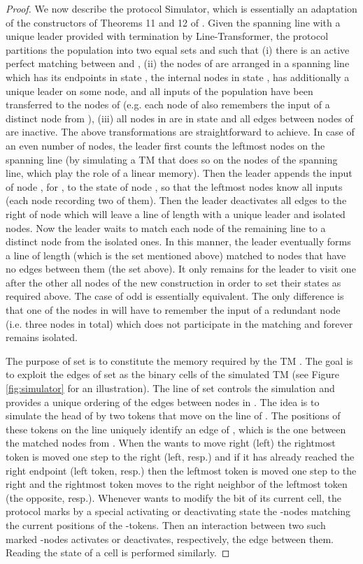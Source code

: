\documentclass[preprint]{elsarticle}
\begin{document}
\begin{proof}
We now describe the protocol Simulator, which is essentially an adaptation of the constructors of Theorems 11 and 12 of \cite{MS14}. Given the spanning line with a unique leader provided with termination by Line-Transformer, the protocol partitions the population into two equal sets  and  such that (i) there is an active perfect matching between  and , (ii) the nodes of  are arranged in a spanning line which has its endpoints in state , the internal nodes in state , has additionally a unique leader on some node, and all inputs of the population have been transferred to the nodes of  (e.g. each node of  also remembers the input of a distinct node from ), (iii) all nodes in  are in state  and all edges between nodes of  are inactive. The above transformations are straightforward to achieve. In case of an even number of nodes, the leader first counts the  leftmost nodes on the spanning line (by simulating a TM that does so on the nodes of the spanning line, which play the role of a linear memory). Then the leader appends the input of node , for , to the state of node , so that the  leftmost nodes know all inputs (each node recording two of them). Then the leader deactivates all edges to the right of node  which will leave a line of length  with a unique leader and  isolated nodes. Now the leader waits to match each node of the remaining line to a distinct node from the isolated ones. In this manner, the leader eventually forms a line of length  (which is the set  mentioned above) matched to  nodes that have no edges between them (the set  above). It only remains for the leader to visit one after the other all nodes of the new construction in order to set their states as required above. The case of odd  is essentially equivalent. The only difference is that one of the nodes in  will have to remember the input of a redundant node (i.e. three nodes in total) which does not participate in the matching and forever remains isolated.


The purpose of set  is to constitute the  memory required by the TM . The goal is to exploit the  edges of set  as the binary cells of the simulated TM (see Figure \ref{fig:simulator} for an illustration). The line of set  controls the simulation and provides a unique ordering of the edges between nodes in . The idea is to simulate the head of  by two tokens that move on the line of . The positions  of these tokens on the line uniquely identify an edge of , which is the one between the matched nodes  from . When the  wants to move right (left) the rightmost token is moved one step to the right (left, resp.) and if it has already reached the right endpoint (left token, resp.) then the leftmost token is moved one step to the right and the rightmost token moves to the right neighbor of the leftmost token (the opposite, resp.). Whenever  wants to modify the bit of its current cell, the protocol marks by a special activating or deactivating state the -nodes matching the current positions of the -tokens. Then an interaction between two such marked -nodes activates or deactivates, respectively, the edge between them. Reading the state of a cell is performed similarly.
\end{proof}
\end{document}
